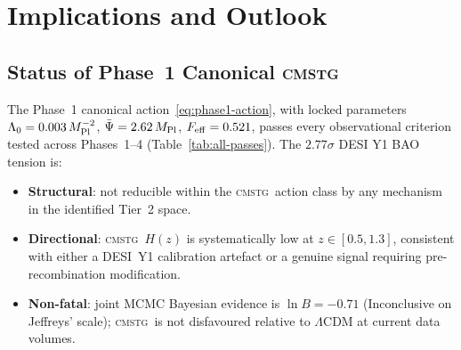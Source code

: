 \documentclass[12pt,a4paper]{article}
\newcommand{\CMSTG}{\textsc{cmstg}}
\newcommand{\Psibar}{\bar\Psi}
\newcommand{\Feff}{F_{\rm eff}}
\newcommand{\Lz}{\Lambda_0}
\newcommand{\Mpl}{M_{\rm Pl}}
\theoremstyle{plain}
\begin{document}
\section{Implications and Outlook}
\label{sec:implications}

\subsection{Status of Phase~1 Canonical \CMSTG}

The Phase~1 canonical action~\eqref{eq:phase1-action}, with locked parameters
$\Lz=0.003\,\Mpl^{-2}$, $\Psibar=2.62\,\Mpl$, $\Feff=0.521$, passes every
observational criterion tested across Phases~1--4 (Table~\ref{tab:all-passes}).
The $2.77\sigma$ DESI Y1 BAO tension is:
\begin{itemize}
  \item \textbf{Structural}: not reducible within the \CMSTG\ action class
    by any mechanism in the identified Tier~2 space.
  \item \textbf{Directional}: \CMSTG\ $H(z)$ is systematically low at
    $z\in[0.5,1.3]$, consistent with either a DESI~Y1 calibration artefact
    or a genuine signal requiring pre-recombination modification.
  \item \textbf{Non-fatal}: joint MCMC Bayesian evidence is
    $\ln B=-0.71$ (Inconclusive on Jeffreys' scale); \CMSTG\ is not
    disfavoured relative to $\Lambda$CDM at current data volumes.
\end{itemize}
\end{document}
